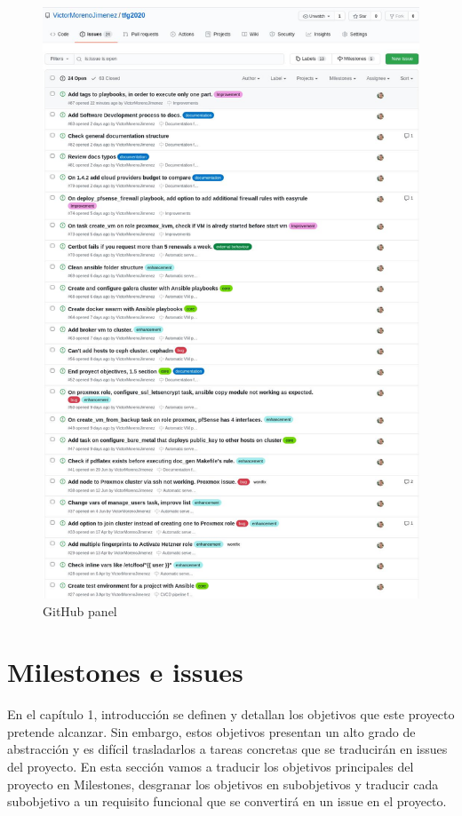 \begin{text}
	
	\begin{figure}[!hbt]
		\centering
		\includegraphics[scale=0.46]{imagenes/Analisis/githubissues.jpg}
		\caption[GitHub panel]{GitHub panel \cite{githubrepo:online}}
		\label{github_issues}
	\end{figure}
\end{text}
\clearpage

\section{Milestones e issues}
\begin{text}
	En el capítulo 1, introducción se definen y detallan los objetivos que este proyecto pretende alcanzar. Sin embargo, estos objetivos presentan un alto grado de abstracción y es difícil trasladarlos a tareas concretas que se traducirán en issues del proyecto. En esta sección vamos a traducir los objetivos principales del proyecto en Milestones, desgranar los objetivos en subobjetivos y traducir cada subobjetivo a un requisito funcional que se convertirá en un issue en el proyecto.
\end{text}

